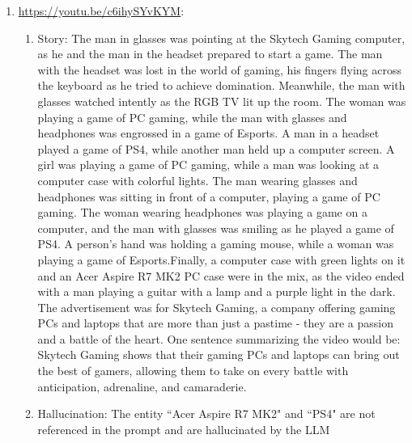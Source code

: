 \documentclass[hidelinks,11pt,a4paper]{report}
\begin{document}
\begin{enumerate}
    \item  \url{https://youtu.be/c6ihySYvKYM}:
    \begin{enumerate}
        \item Story: The man in glasses was pointing at the Skytech Gaming computer, as he and the man in the headset prepared to start a game. The man with the headset was lost in the world of gaming, his fingers flying across the keyboard as he tried to achieve domination. Meanwhile, the man with glasses watched intently as the RGB TV lit up the room. The woman was playing a game of PC gaming, while the man with glasses and headphones was engrossed in a game of Esports. A man in a headset played a game of PS4, while another man held up a computer screen. A girl was playing a game of PC gaming, while a man was looking at a computer case with colorful lights. The man wearing glasses and headphones was sitting in front of a computer, playing a game of PC gaming. The woman wearing headphones was playing a game on a computer, and the man with glasses was smiling as he played a game of PS4. A person's hand was holding a gaming mouse, while a woman was playing a game of Esports.Finally, a computer case with green lights on it and an Acer Aspire R7 MK2 PC case were in the mix, as the video ended with a man playing a guitar with a lamp and a purple light in the dark. The advertisement was for Skytech Gaming, a company offering gaming PCs and laptops that are more than just a pastime - they are a passion and a battle of the heart. One sentence summarizing the video would be: Skytech Gaming shows that their gaming PCs and laptops can bring out the best of gamers, allowing them to take on every battle with anticipation, adrenaline, and camaraderie.

        \item Hallucination: The entity ``Acer Aspire R7 MK2" and ``PS4" are not referenced in the prompt and are hallucinated by the LLM 
    \end{enumerate}


\end{enumerate}
\end{document}
